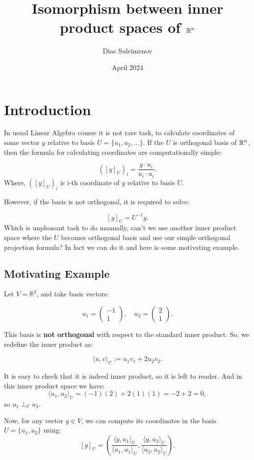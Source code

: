 \documentclass{article}
\title{Isomorphism between inner product spaces of $\mathbb{R}^n$}
\author{Dias Suleimenov}
\date{April 2024}
\begin{document}
\maketitle

\section*{Introduction}

In usual Linear Algebra course it is not rare task, to calculate coordinates of some vector $y$ relative to basis $U = \{u_1, u_2, ...\}$. If the $U$ is orthogonal basis of $\mathbb{R}^n$, then the formula for calculating coordinates are computationally simple:

\[
([y]_U)_i = \frac{y \cdot u_i}{u_i \cdot u_i}.
\]
Where, $([y]_U)_i$ is i-th coordinate of $y$ relative to basis $U$. 

However, if the basis is not orthogonal, it is required to solve:

\[
[y]_U = U^{-1}y.
\]
Which is unpleasant task to do manually, can't we use another inner product space where the $U$ becomes orthogonal basis and use our simple orthogonal projection formula? In fact we can do it and here is some motivating example.

\subsection*{Motivating Example}

Let \( V = \mathbb{R}^2 \), and take basis vectors:

\[
u_1 = \begin{pmatrix} -1 \\ 1 \end{pmatrix}, \quad u_2 = \begin{pmatrix} 2 \\ 1 \end{pmatrix}.
\]

This basis is \textbf{not orthogonal} with respect to the standard inner product. So, we redefine the inner product as:

\[
\langle u, v \rangle_U := u_1 v_1 + 2 u_2 v_2.
\]

It is easy to check that it is indeed inner product, so it is left to reader. And in this inner product space we have:
\[
\langle u_1, u_2 \rangle_U = (-1)(2) + 2(1)(1) = -2 + 2 = 0,
\]
so \( u_1 \perp_U u_2 \).

\bigskip

Now, for any vector \( y \in V \), we can compute its coordinates in the basis \( U = \{u_1, u_2\} \) using:
\[
[y]_U = \left( \frac{\langle y, u_1 \rangle_U}{\langle u_1, u_1 \rangle_U}, \frac{\langle y, u_2 \rangle_U}{\langle u_2, u_2 \rangle_U} \right).
\]
\end{document}
